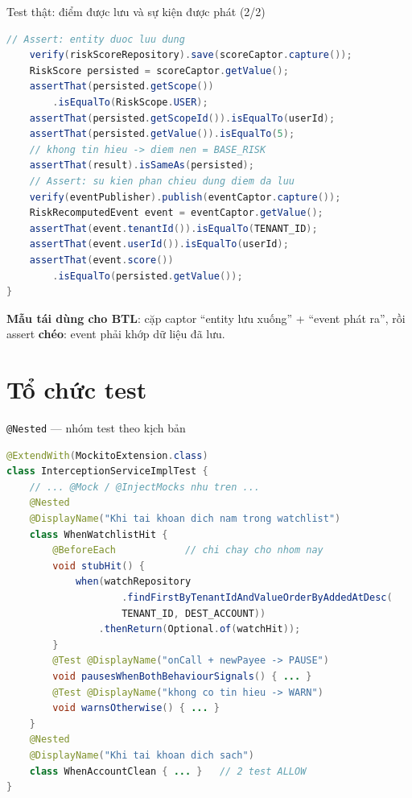 \documentclass[aspectratio=169,12pt]{beamer}
\begin{document}
\begin{frame}[fragile]{Test thật: điểm được lưu và sự kiện được phát (2/2)}
\begin{lstlisting}[language=java,basicstyle=\ttfamily\scriptsize]
    // Assert: entity duoc luu dung
    verify(riskScoreRepository).save(scoreCaptor.capture());
    RiskScore persisted = scoreCaptor.getValue();
    assertThat(persisted.getScope())
        .isEqualTo(RiskScope.USER);
    assertThat(persisted.getScopeId()).isEqualTo(userId);
    assertThat(persisted.getValue()).isEqualTo(5);
    // khong tin hieu -> diem nen = BASE_RISK
    assertThat(result).isSameAs(persisted);
    // Assert: su kien phan chieu dung diem da luu
    verify(eventPublisher).publish(eventCaptor.capture());
    RiskRecomputedEvent event = eventCaptor.getValue();
    assertThat(event.tenantId()).isEqualTo(TENANT_ID);
    assertThat(event.userId()).isEqualTo(userId);
    assertThat(event.score())
        .isEqualTo(persisted.getValue());
}
\end{lstlisting}

  \vspace{-0.2em}
  {\small \textbf{Mẫu tái dùng cho BTL}: cặp captor ``entity lưu xuống'' +
  ``event phát ra'', rồi assert \textbf{chéo}: event phải khớp dữ liệu đã lưu.}
\end{frame}

\section{Tổ chức test}

\begin{frame}[fragile]{\texttt{@Nested} --- nhóm test theo kịch bản}
\begin{lstlisting}[language=java,basicstyle=\ttfamily\scriptsize]
@ExtendWith(MockitoExtension.class)
class InterceptionServiceImplTest {
    // ... @Mock / @InjectMocks nhu tren ...
    @Nested
    @DisplayName("Khi tai khoan dich nam trong watchlist")
    class WhenWatchlistHit {
        @BeforeEach            // chi chay cho nhom nay
        void stubHit() {
            when(watchRepository
                    .findFirstByTenantIdAndValueOrderByAddedAtDesc(
                    TENANT_ID, DEST_ACCOUNT))
                .thenReturn(Optional.of(watchHit));
        }
        @Test @DisplayName("onCall + newPayee -> PAUSE")
        void pausesWhenBothBehaviourSignals() { ... }
        @Test @DisplayName("khong co tin hieu -> WARN")
        void warnsOtherwise() { ... }
    }
    @Nested
    @DisplayName("Khi tai khoan dich sach")
    class WhenAccountClean { ... }   // 2 test ALLOW
}
\end{lstlisting}
\end{frame}
\end{document}
